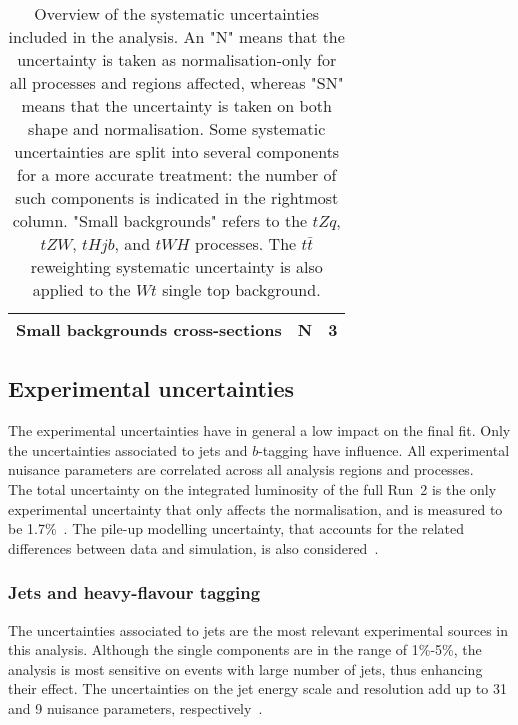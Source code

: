\begin{table}[htbp]
\begin{tabular}{lcc}
  \hspace{2ex}Small backgrounds cross-sections	&   N  &  3  \\
  \bottomrule
  \bottomrule
  \end{tabular}
  \caption{
  Overview of the systematic uncertainties included in the analysis.
  An "N" means that the uncertainty is taken as normalisation-only for all processes and regions affected,  whereas "SN" means that the uncertainty is taken on both shape and normalisation. Some systematic uncertainties are split into several components for a more accurate treatment:  the number of such components is indicated in the rightmost column.
  "Small backgrounds" refers to the $tZq$, $tZW$, %
  $tHjb$, and $tWH$ processes. The $t\bar t$ reweighting systematic uncertainty is also applied to the $Wt$ single top background.
  }
  \label{Hplustb:tablesys}
\end{table}

\subsection{Experimental uncertainties}
\label{Hplustb:SectionExperimentalUnc}
The experimental uncertainties have in general a low impact on the final fit. Only the uncertainties associated to jets and $b$-tagging have influence. All experimental nuisance parameters are correlated across all analysis regions and processes.\\

The total uncertainty on the integrated luminosity of the full Run~2 is the only experimental uncertainty that only affects the normalisation, and is measured to be 1.7\%~\cite{luminosity}. The pile-up modelling uncertainty, that accounts for the related differences between data and simulation, is also considered~\cite{PhysRevLett.117.182002}.

\subsubsection{Jets and heavy-flavour tagging}
The uncertainties associated to jets are the most relevant experimental sources in this analysis. Although the single components are in the range of 1\%-5\%, the analysis is most sensitive on events with large number of jets, thus enhancing their effect. The uncertainties on the jet energy scale and resolution add up to 31 and 9 nuisance parameters, respectively~\cite{ATLAS_Collaboration2020-wc,Aaboud_2020}.\\

